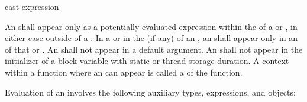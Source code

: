 \begin{bnf}
\br
     cast-expression
\end{bnf}

\pnum
An  shall appear only as a potentially-evaluated
expression within the  of a
 or ,
in either case
outside of a .
In a  or in the
 (if any)
of an , an 
shall appear only in an  of that
 or .
An  shall not appear in a
default argument.
An  shall not appear in the initializer of
a block variable with static or thread storage duration.
A context within a function where an  can appear
is called a  of the function.

\pnum
Evaluation of an  involves the following
auxiliary types, expressions, and objects:

